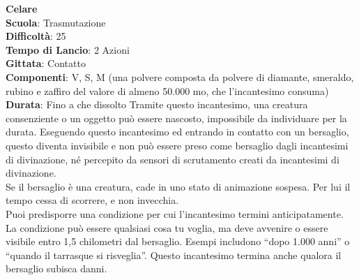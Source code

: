 \begin{multicols}{2}
\medskip\textbf{Celare}\\
\textbf{Scuola}: Trasmutazione\\
\textbf{Difficoltà}:  25\\
\textbf{Tempo di Lancio}: 2 Azioni\\
\textbf{Gittata}: Contatto\\
\textbf{Componenti}: V, S, M (una polvere composta da polvere di diamante, smeraldo, rubino e zaffiro del valore di almeno 50.000 mo, che l'incantesimo consuma)\\
\textbf{Durata}: Fino a che dissolto Tramite questo incantesimo, una creatura consenziente o un oggetto può essere nascosto, impossibile da individuare per la durata. Eseguendo questo incantesimo ed entrando in contatto con un bersaglio, questo diventa invisibile e non può essere preso come bersaglio dagli incantesimi di divinazione, né percepito da sensori di scrutamento creati da incantesimi di divinazione.\\
Se il bersaglio è una creatura, cade in uno stato di animazione sospesa. Per lui il tempo cessa di scorrere, e non invecchia. \\
Puoi predisporre una condizione per cui l'incantesimo termini anticipatamente. La condizione può essere qualsiasi cosa tu voglia, ma deve avvenire o essere visibile entro 1,5 chilometri dal bersaglio. Esempi includono “dopo 1.000 anni” o “quando il tarrasque si risveglia”. Questo incantesimo termina anche qualora il bersaglio subisca danni.



\end{multicols}

